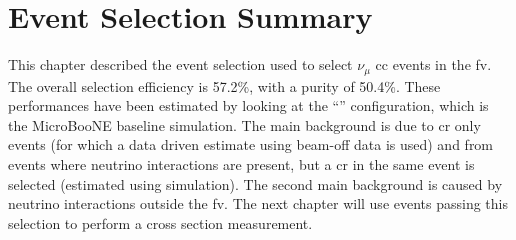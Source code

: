 \section{Event Selection Summary}

This chapter described the event selection used to select $\nu_\mu$ \acrshort{cc} events in the \acrshort{fv}. The overall selection efficiency is 57.2\%, with a purity of 50.4\%. These performances have been estimated by looking at the ``\tuneone'' configuration, which is the MicroBooNE baseline simulation. The main background is due to \acrshort{cr} only events (for which a data driven estimate using beam-off data is used) and from events where neutrino interactions are present, but a \acrshort{cr} in the same event is selected (estimated using simulation). The second main background is caused by neutrino interactions outside the \acrshort{fv}. The next chapter will use events passing this selection to perform a cross section measurement.


